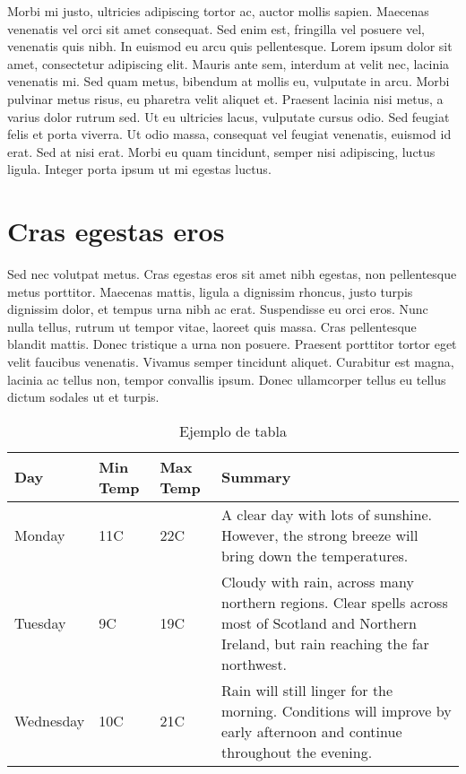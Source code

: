 Morbi mi justo, ultricies adipiscing tortor ac, auctor mollis sapien. Maecenas venenatis vel orci sit amet consequat. Sed enim est, fringilla vel posuere vel, venenatis quis nibh. In euismod eu arcu quis pellentesque. Lorem ipsum dolor sit amet, consectetur adipiscing elit. Mauris ante sem, interdum at velit nec, lacinia venenatis mi. Sed quam metus, bibendum at mollis eu, vulputate in arcu. Morbi pulvinar metus risus, eu pharetra velit aliquet et. Praesent lacinia nisi metus, a varius dolor rutrum sed. Ut eu ultricies lacus, vulputate cursus odio. Sed feugiat felis et porta viverra. Ut odio massa, consequat vel feugiat venenatis, euismod id erat. Sed at nisi erat. Morbi eu quam tincidunt, semper nisi adipiscing, luctus ligula. Integer porta ipsum ut mi egestas luctus.

\section{Cras egestas eros}
Sed nec volutpat metus. Cras egestas eros sit amet nibh egestas, non pellentesque metus porttitor. Maecenas mattis, ligula a dignissim rhoncus, justo turpis dignissim dolor, et tempus urna nibh ac erat. Suspendisse eu orci eros. Nunc nulla tellus, rutrum ut tempor vitae, laoreet quis massa. Cras pellentesque blandit mattis. Donec tristique a urna non posuere. Praesent porttitor tortor eget velit faucibus venenatis. Vivamus semper tincidunt aliquet. Curabitur est magna, lacinia ac tellus non, tempor convallis ipsum. Donec ullamcorper tellus eu tellus dictum sodales ut et turpis.


\begin{table}[h]
\caption{Ejemplo de tabla}
\begin{center}
    \begin{tabular}{ | l | l | l | p{5cm} |}
    \hline
    Day & Min Temp & Max Temp & Summary \\ \hline
    Monday & 11C & 22C & A clear day with lots of sunshine.  
    However, the strong breeze will bring down the temperatures. \\ \hline
    Tuesday & 9C & 19C & Cloudy with rain, across many northern regions. Clear spells
    across most of Scotland and Northern Ireland,
    but rain reaching the far northwest. \\ \hline
    Wednesday & 10C & 21C & Rain will still linger for the morning.
    Conditions will improve by early afternoon and continue
    throughout the evening. \\
    \hline
    \end{tabular}
\end{center}
\label{etiquetaTabla}
\end{table}

